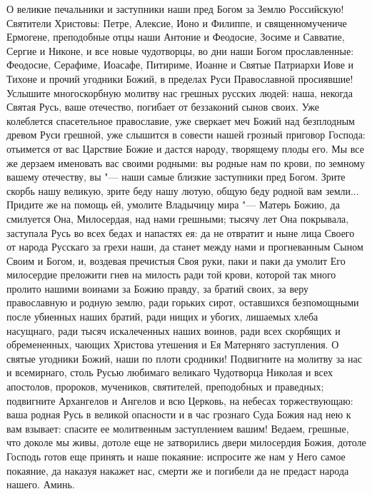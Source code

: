 О великие печальники и заступники наши пред Богом за Землю Российскую! Святители Христовы: Петре, Алексие, Ионо и Филиппе, и священномучениче Ермогене, преподобные отцы наши Антоние и Феодосие, Зосиме и Савватие, Сергие и Никоне, и все новые чудотворцы, во дни наши Богом прославленные: Феодосие, Серафиме, Иоасафе, Питириме, Иоанне и Святые Патриархи Иове и Тихоне и прочий угодники Божий, в пределах Руси Православной просиявшие! Услышите многоскорбную молитву нас грешных русских людей: наша, некогда Святая Русь, ваше отечество, погибает от беззаконий сынов своих. Уже колеблется спасетельное православие, уже сверкает меч Божий над безплодным древом Руси грешной, уже слышится в совести нашей грозный приговор Господа: отьимется от вас Царствие Божие и дастся народу, творящему плоды его. Мы все же дерзаем именовать вас своими родными: вы родные нам по крови, по земному вашему отечеству, вы "--- наши самые близкие заступники пред Богом. Зрите скорбь нашу великую, зрите беду нашу лютую, общую беду родной вам земли... Придите же на помощь ей, умолите Владычицу мира "--- Матерь Божию, да смилуется Она, Милосердая, над нами грешными; тысячу лет Она покрывала, заступала Русь во всех бедах и напастях ея: да не отвратит и ныне лица Своего от народа Русскаго за грехи наши, да станет между нами и прогневанным Сыном Своим и Богом, и, воздевая пречистыя Своя руки, паки и паки да умолит Его милосердие преложити гнев на милость ради той крови, которой так много пролито нашими воинами за Божию правду, за братий своих, за веру православную и родную землю, ради горьких сирот, оставшихся безпомощными после убиенных наших братий, ради нищих и убогих, лишаемых хлеба насущнаго, ради тысяч искалеченных наших воинов, ради всех скорбящих и обремененных, чающих Христова утешения и Ея Матерняго заступления. О святые угодники Божий, наши по плоти сродники! Подвигните на молитву за нас и всемирнаго, столь Русью любимаго великаго Чудотворца Николая и всех апостолов, пророков, мучеников, святителей, преподобных и праведных; подвигните Архангелов и Ангелов и всю Церковь, на небесах торжествующаю: ваша родная Русь в великой опасности и в час грознаго Суда Божия над нею к вам взывает: спасите ее молитвенным заступлением вашим! Ведаем, грешные, что доколе мы живы, дотоле еще не затворились двери милосердия Божия, дотоле Господь готов еще принять и наше покаяние: испросите же нам у Него самое покаяние, да наказуя накажет нас, смерти же и погибели да не предаст народа нашего. Аминь.





